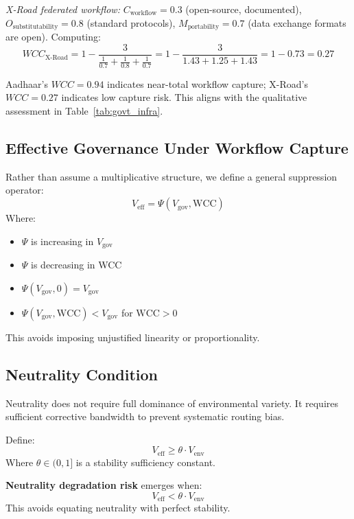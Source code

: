 \documentclass{article}
\begin{document}
\textit{X-Road federated workflow:} $C_{\text{workflow}} = 0.3$ (open-source, documented), $O_{\text{substitutability}} = 0.8$ (standard protocols), $M_{\text{portability}} = 0.7$ (data exchange formats are open). Computing:
\[
WCC_{\text{X-Road}} = 1 - \frac{3}{\frac{1}{0.7} + \frac{1}{0.8} + \frac{1}{0.7}} = 1 - \frac{3}{1.43 + 1.25 + 1.43} = 1 - 0.73 = 0.27
\]

Aadhaar's $WCC = 0.94$ indicates near-total workflow capture; X-Road's $WCC = 0.27$ indicates low capture risk. This aligns with the qualitative assessment in Table~\ref{tab:govt_infra}.

\subsection{Effective Governance Under Workflow Capture}

Rather than assume a multiplicative structure, we define a general suppression operator:
\begin{equation}
V_{\text{eff}} = \Psi(V_{\text{gov}}, \text{WCC})
\end{equation}
Where:
\begin{itemize}[noitemsep]
    \item $\Psi$ is increasing in $V_{\text{gov}}$
    \item $\Psi$ is decreasing in WCC
    \item $\Psi(V_{\text{gov}}, 0) = V_{\text{gov}}$
    \item $\Psi(V_{\text{gov}}, \text{WCC}) < V_{\text{gov}}$ for $\text{WCC} > 0$
\end{itemize}
This avoids imposing unjustified linearity or proportionality.

\subsection{Neutrality Condition}

Neutrality does not require full dominance of environmental variety. It requires sufficient corrective bandwidth to prevent systematic routing bias.

Define:
\begin{equation}
V_{\text{eff}} \geq \theta \cdot V_{\text{env}}
\end{equation}
Where $\theta \in (0,1]$ is a stability sufficiency constant.

\textbf{Neutrality degradation risk} emerges when:
\begin{equation}
V_{\text{eff}} < \theta \cdot V_{\text{env}}
\end{equation}
This avoids equating neutrality with perfect stability.
\end{document}
